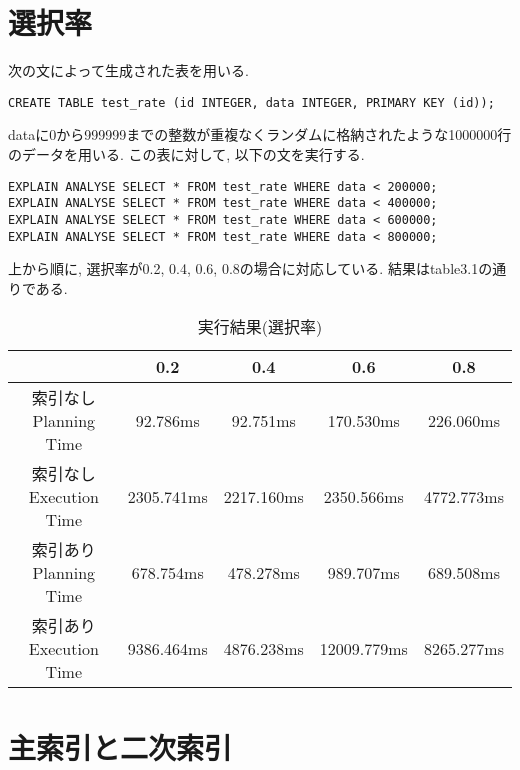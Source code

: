\documentclass{jarticle}
\begin{document}
\section{選択率}
次の文によって生成された表を用いる.
\begin{verbatim}
CREATE TABLE test_rate (id INTEGER, data INTEGER, PRIMARY KEY (id));
\end{verbatim}
dataに0から999999までの整数が重複なくランダムに格納されたような1000000行のデータを用いる. この表に対して, 以下の文を実行する.
\begin{verbatim}
EXPLAIN ANALYSE SELECT * FROM test_rate WHERE data < 200000;
EXPLAIN ANALYSE SELECT * FROM test_rate WHERE data < 400000;
EXPLAIN ANALYSE SELECT * FROM test_rate WHERE data < 600000;
EXPLAIN ANALYSE SELECT * FROM test_rate WHERE data < 800000;
\end{verbatim}
上から順に, 選択率が0.2, 0.4, 0.6, 0.8の場合に対応している. 結果はtable3.1の通りである.
\begin{table}[htbp]
  \begin{tabular}{|c||c|c|c|c|} \hline
  & 0.2 & 0.4 & 0.6 & 0.8 \\ \hline \hline
  索引なし Planning Time & 92.786ms & 92.751ms & 170.530ms & 226.060ms \\ \hline
  索引なし Execution Time & 2305.741ms & 2217.160ms & 2350.566ms & 4772.773ms \\ \hline
  索引あり Planning Time & 678.754ms & 478.278ms & 989.707ms & 689.508ms \\ \hline
  索引あり Execution Time & 9386.464ms & 4876.238ms & 12009.779ms & 8265.277ms \\ \hline
  \end{tabular}
  \centering
  \caption{実行結果(選択率)}
\end{table}

\section{主索引と二次索引}
\end{document}
